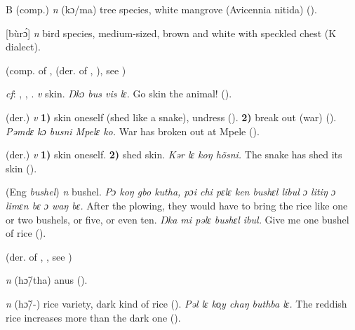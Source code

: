 \begin{letter}{B}
 (comp.) \textit{n} (kɔ/ma) tree species, white mangrove (Avicennia nitida) (\citealt{Pichl1967}). 

 [bùrɔ́] \textit{n} bird species, medium-sized, brown and white with speckled chest (K dialect). 

 (comp. of ,  (der. of , ), see ) 

 \textit{cf}: , , . \textit{v} skin. \textit{Ŋkɔ bus vis lɛ.} Go skin the animal! (\citealt{Pichl1967}). 

 (der.) \textit{v} \textbf{1)} skin oneself (shed like a snake), undress (\citealt{Pichl1967}). \textbf{2)} break out (war) (\citealt{Pichl1967}). \textit{Pəmdɛ kɔ busni Mpelɛ ko.} War has broken out at Mpele (\citealt{Pichl1967}). 

 (der.) \textit{v} \textbf{1)} skin oneself. \textbf{2)} shed skin. \textit{Kər lɛ koŋ hõsni.} The snake has shed its skin (\citealt{Pichl1967}). 

 (Eng \textit{bushel}) \textit{n} bushel. \textit{Pɔ koŋ gbo kutha, pɔi chi pɛlɛ ken bushɛl libul ɔ litiŋ ɔ limɛn bɛ ɔ waŋ bɛ.} After the plowing, they would have to bring the rice like one or two bushels, or five, or even ten. \textit{Ŋka mi pəlɛ bushɛl ibul.} Give me one bushel of rice (\citealt{Pichl1967}). 

 (der. of , , see ) 

 \textit{n} (hɔ̃/tha) anus (\citealt{Pichl1967}).

 \textit{n} (hɔ̃/-) rice variety, dark kind of rice (\citealt{Pichl1967}). \textit{Pəl lɛ ko̹y chaŋ buthba lɛ.} The reddish rice increases more than the dark one (\citealt{Pichl1967}). 

\end{letter}

